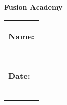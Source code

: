 \documentclass[12pt]{article}
\makeatletter
\newcommand{\myID}{\@ID}
\newcommand{\myDate}{\@Date}
\makeatother
\begin{document}
\thispagestyle{empty}
{\sf
\textbf{\LARGE{Fusion Academy}}


\vspace*{2cm}

\begin{tabular}{p{14cm}}
\textbf{Name:} \hrule \\[1.5cm]
\textbf{Date:} \hrule \\[1.5cm]
\end{tabular}
% 


}

\begin{enumerate}


\end{enumerate}
\end{document}

